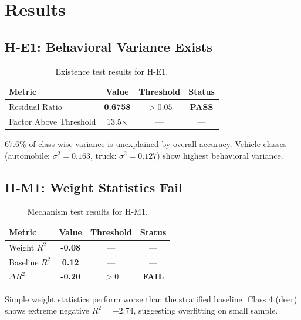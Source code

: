\section{Results}

\subsection{H-E1: Behavioral Variance Exists}

\begin{table}[h]
\centering
\begin{tabular}{lccc}
\toprule
Metric & Value & Threshold & Status \\
\midrule
Residual Ratio & \textbf{0.6758} & $> 0.05$ & \textbf{PASS} \\
Factor Above Threshold & 13.5$\times$ & --- & --- \\
\bottomrule
\end{tabular}
\caption{Existence test results for H-E1.}
\label{tab:existence}
\end{table}

67.6\% of class-wise variance is unexplained by overall accuracy. Vehicle classes (automobile: $\sigma^2 = 0.163$, truck: $\sigma^2 = 0.127$) show highest behavioral variance.

\subsection{H-M1: Weight Statistics Fail}

\begin{table}[h]
\centering
\begin{tabular}{lccc}
\toprule
Metric & Value & Threshold & Status \\
\midrule
Weight $R^2$ & \textbf{-0.08} & --- & --- \\
Baseline $R^2$ & \textbf{0.12} & --- & --- \\
$\Delta R^2$ & \textbf{-0.20} & $> 0$ & \textbf{FAIL} \\
\bottomrule
\end{tabular}
\caption{Mechanism test results for H-M1.}
\label{tab:mechanism}
\end{table}

Simple weight statistics perform worse than the stratified baseline. Class 4 (deer) shows extreme negative $R^2 = -2.74$, suggesting overfitting on small sample.
